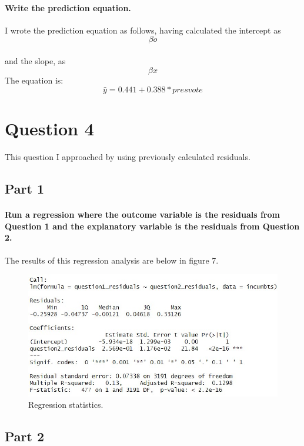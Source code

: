 \documentclass{article}
\begin{document}
\paragraph{Write the prediction equation.}
I wrote the prediction equation as follows, having calculated the intercept as 
\begin{equation}
	\beta o
\end{equation} 
\paragraph{}and the slope, as 
\begin{equation}
	\beta x
\end{equation}The equation is:
\begin{equation}
	\hat{y} = 0.441 + 0.388 * presvote
\end{equation}
	\section{Question 4}
This question I approached by using previously calculated residuals.
\subsection{Part 1}
\paragraph{Run a regression where the outcome variable is the residuals from Question 1 and the explanatory variable is the residuals from Question 2.}
The results of this regression analysis are below in figure 7. 
\begin{figure}[h!]
\centering
\includegraphics[width=0.9\linewidth]{Question4RegressionAnalysis.jpg}
\caption{Regression statistics.}
\label{fig:Regression statistics}
\end{figure}
\subsection{Part 2}
\end{document}
